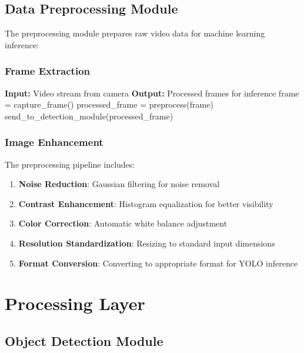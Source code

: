 \subsection{Data Preprocessing Module}

The preprocessing module prepares raw video data for machine learning inference:

\subsubsection{Frame Extraction}

\begin{algorithmic}[1]
\STATE \textbf{Input:} Video stream from camera
\STATE \textbf{Output:} Processed frames for inference
\STATE 
{}
    \STATE frame = capture\_frame()
        \STATE processed\_frame = preprocess(frame)
        \STATE send\_to\_detection\_module(processed\_frame)
    \ENDIF
\ENDWHILE
\end{algorithmic}

\subsubsection{Image Enhancement}

The preprocessing pipeline includes:

\begin{enumerate}
    \item \textbf{Noise Reduction}: Gaussian filtering for noise removal
    \item \textbf{Contrast Enhancement}: Histogram equalization for better visibility
    \item \textbf{Color Correction}: Automatic white balance adjustment
    \item \textbf{Resolution Standardization}: Resizing to standard input dimensions
    \item \textbf{Format Conversion}: Converting to appropriate format for YOLO inference
\end{enumerate}

\section{Processing Layer}

\subsection{Object Detection Module}

